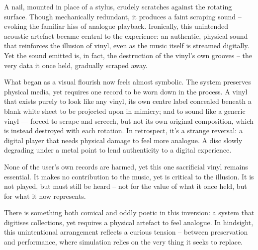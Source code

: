 \begin{uomappendix}
        A nail, mounted in place of a stylus, crudely scratches against the rotating surface. Though mechanically redundant, it produces a faint scraping sound -- evoking the familiar hiss of analogue playback. Ironically, this unintended acoustic artefact became central to the experience: an authentic, physical sound that reinforces the illusion of vinyl, even as the music itself is streamed digitally. Yet the sound emitted is, in fact, the destruction of the vinyl’s own grooves -- the very data it once held, gradually scraped away.
        
        What began as a visual flourish now feels almost symbolic. The system preserves physical media, yet requires one record to be worn down in the process. A vinyl that exists purely to look like any vinyl, its own centre label concealed beneath a blank white sheet to be projected upon in mimicry; and to sound like a generic vinyl — forced to scrape and screech, but not its own original composition, which is instead destroyed with each rotation. In retrospect, it's a strange reversal: a digital player that needs physical damage to feel more analogue. A disc slowly degrading under a metal point to lend authenticity to a digital experience.
        
        None of the user’s own records are harmed, yet this one sacrificial vinyl remains essential. It makes no contribution to the music, yet is critical to the illusion. It is not played, but must still be heard -- not for the value of what it once held, but for what it now represents.
        
        There is something both comical and oddly poetic in this inversion: a system that digitises collections, yet requires a physical artefact to feel analogue. In hindsight, this unintentional arrangement reflects a curious tension -- between preservation and performance, where simulation relies on the very thing it seeks to replace.
        
    \end{uomappendix}
    
    
    